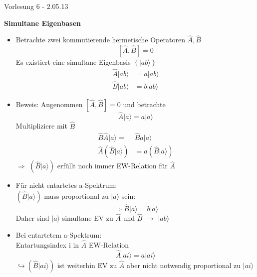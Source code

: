 \documentclass[10pt,article,colorback,accentcolor=tud9d]{scrartcl}
\begin{document}
\begin{flushright}
Vorlesung 6 - 2.05.13
\end{flushright}
\textbf{Simultane Eigenbasen}
  \begin{itemize}
    \item Betrachte zwei kommutierende hermetische Operatoren $\hat{A},\hat{B}$
      \begin{equation}
        \left[\hat{A},\hat{B}\right]=0
      \end{equation}
      Es existiert eine simultane Eigenbasis $\left\{|ab\rangle\right\}$
      \begin{equation}
      \begin{aligned}
      \hat{A}|ab\rangle&=a|ab\rangle\\
      \hat{B}|ab\rangle&=b|ab\rangle
      \end{aligned}
      \end{equation}
    \item Beweis: Angenommen $\left[\hat{A},\hat{B}\right]=0$ und betrachte 
      \begin{equation}
      \hat{A}|a\rangle=a|a\rangle
      \end{equation}
      Multipliziere mit $\hat{B}$
      \begin{equation}
      \begin{aligned}
      \hat{B}\hat{A}|a\rangle=&\hat{B}a|a\rangle\\
      \hat{A}\left(\hat{B}|a\rangle\right)&=a\left(\hat{B}|a\rangle\right)
      \end{aligned}
      \end{equation}
        $\Rightarrow$ $\left(\hat{B}|a\rangle\right)$ erfüllt noch immer EW-Relation für $\hat{A}$
    \item Für nicht entartetes a-Spektrum:\\
      $\left(\hat{B}|a\rangle\right)$ muss proportional zu $|a\rangle$ sein:
      \begin{equation}
      \Rightarrow \hat{B}|a\rangle=b|a\rangle
      \end{equation}
      Daher sind $|a\rangle$ simultane EV zu $\hat{A}$ und $\hat{B}$ $\rightarrow$ $|ab\rangle$
    \item Bei entartetem a-Spektrum:\\
      Entartungsindex i in $\hat{A}$ EW-Relation
      \begin{equation}
      \hat{A}|ai\rangle =a|ai\rangle
      \end{equation}
      $\hookrightarrow \left(\hat{B}|ai\rangle\right)$ ist weiterhin EV zu $\hat{A}$ aber nicht notwendig proportional zu $|ai\rangle$\\

\end{itemize}
\end{document}
